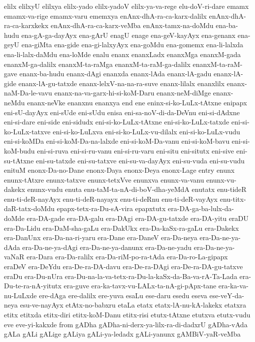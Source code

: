 {elilx
elilxyU
elilxya
elilx-yado
elilx-yadoV
elilx-ya-va-rege
elu-doV-ri-dare
emamx
emamx-va-rige
emamx-varu
ememxya
enAnx-dhA-ra-ca-karx-dalilx
enAnx-dhA-ra-ca-karxkekx
enAnx-dhA-ra-ca-karx-veMba
enAnx-tamx-na-doMdu
ena-ba-hudu
ena-gA-ga-dayAyx
ena-gArU
enagU
enage
ena-geV-kayAyx
ena-genanx
ena-geyU
ena-giMta
ena-gide
ena-gi-lalxyAyx
ena-goMdu
ena-gomemx
ena-li-lalxda
ena-li-lalx-daMdu
ena-loMde
enalu
enanx
enanxLadx
enanxMga
enanxM-gada
enanxM-ga-dalilx
enanxM-ta-raMga
enanxM-ta-raM-ga-dalilx
enanxM-ta-raM-gave
enanx-ba-hudu
enanx-dAgi
enanxda
enanx-lAda
enanx-lA-gadu
enanx-lA-gide
enanx-lA-gu-tatxde
enanx-lelxV-na-na-ra-suve
enanx-lilalx
enanxlilx
enanx-naM-Da-le-vavu
enanx-na-va-garx-hi-si-koM-Daru
enanx-neM-diMge
enanx-neMdu
enanx-neVke
enanxnu
enanxya
end
ene
eninx-si-ko-LuLx-tAtxne
enipapx
eni-sU-dayAyx
eni-sUde
eni-sUdu
enisa
eni-sa-noV-di-da-DeVnu
eni-si-dAdxne
eni-si-dare
eni-side
eni-sidudx
eni-si-ko-LuLx-tAtxne
eni-si-ko-LuLx-tatxde
eni-si-ko-LuLx-tatxve
eni-si-ko-LuLxva
eni-si-ko-LuLx-vu-dilalx
eni-si-ko-LuLx-vudu
eni-si-koMDa
eni-si-koM-Da-na-lalxde
eni-si-koM-Da-vanu
eni-si-koM-bavu
eni-si-koM-budu
eni-si-ruva
eni-si-ru-vanu
eni-si-ru-varu
eni-situ
eni-situtx
eni-sive
eni-su-tAtxne
eni-su-tatxde
eni-su-tatxve
eni-su-va-dayAyx
eni-su-vuda
eni-su-vudu
enituM
enonx-Da-no-Dane
enonx-Daya
enonx-Deya
enonx-Lage
entry
enunx
enunx-tAtxre
enunx-tatxve
enunx-tetxVve
enunxva
enunx-va-vanu
enunx-vu-dakekx
enunx-vudu
enuta
enu-taM-ta-nA-di-boV-dha-yeMdA
enutatx
enu-tideR
enu-ti-deR-nayAyx
enu-ti-deR-nayayx
enu-ti-deRnu
enu-ti-deR-vayAyx
enu-titx-daR-tatx-doMdu
epapx-tetx-ra-Du-sA-vira
epapxtutx
era-DA-ga-ba-lulx-da-doMde
era-DA-gade
era-DA-galu
era-DAgi
era-DA-gu-tatxde
era-DA-yitu
eraDU
era-Da-Lidu
era-DaM-sha-gaLu
era-DakUkx
era-Da-kaSx-ra-gaLu
era-Dakekx
era-DanUnx
era-Da-na-ri-yaru
era-Dane
era-DaneV
era-Da-neya
era-Da-ne-ya-dAda
era-Da-ne-ya-dAgi
era-Da-ne-ya-danunx
era-Da-ne-yadu
era-Da-ne-ya-vaNaR
era-Dara
era-Da-ralilx
era-Da-riM-po-ra-tAda
era-Da-ro-La-gipapx
eraDeV
era-DeYdu
era-De-ra-DA-davu
era-De-ra-DAgi
era-De-ra-DA-gu-tatxve
eraDu
era-Du-nUra
era-Du-na-la-va-tetx-ra-Du-la-kaSx-da-Ba-va-rA-Ta-Lada
era-Du-te-ra-nA-yitutx
era-guve
era-ka-tavx-vu-LALx-ta-nA-gi-pApx-tane
era-ka-va-nu-LuLxde
ere-dAga
ere-dalilx
ere-yuva
esaLu
ese-daru
esedu
eseva
ese-veY-da-neya
esu-ve-nayAyx
etAtx-no-babxru
etaLa
etatx
etatx-lA-nu-kA-lakekx
etatxra
etitx
etitxda
etitx-diri
etitx-koM-Danu
etitx-risi
etutx-tAtxne
etutxva
etutx-vudu
eve
eve-yi-kakxde
from
gADha
gADha-ni-derx-ya-lilx-ra-di-dadxrU
gADha-vAda
gALa
gALi
gALige
gALiya
gALi-ya-ledadx
gALi-yanunx
gAMBiV-yaR-veMba
}
